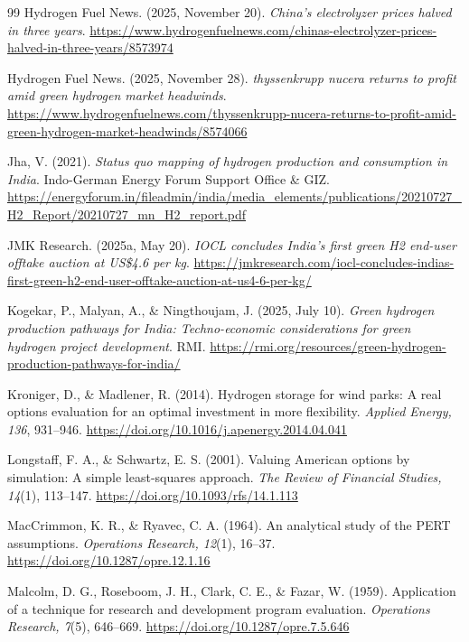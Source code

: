 {\begin{thebibliography}{99}
 Hydrogen Fuel News. (2025, November 20). \emph{China's electrolyzer prices halved in three years}. \url{https://www.hydrogenfuelnews.com/chinas-electrolyzer-prices-halved-in-three-years/8573974}

 Hydrogen Fuel News. (2025, November 28). \emph{thyssenkrupp nucera returns to profit amid green hydrogen market headwinds}. \url{https://www.hydrogenfuelnews.com/thyssenkrupp-nucera-returns-to-profit-amid-green-hydrogen-market-headwinds/8574066}

 Jha, V. (2021). \emph{Status quo mapping of hydrogen production and consumption in India}. Indo-German Energy Forum Support Office \& GIZ. \url{https://energyforum.in/fileadmin/india/media_elements/publications/20210727_H2_Report/20210727_mn_H2_report.pdf}

 JMK Research. (2025a, May 20). \emph{IOCL concludes India's first green H2 end-user offtake auction at US\$4.6 per kg}. \url{https://jmkresearch.com/iocl-concludes-indias-first-green-h2-end-user-offtake-auction-at-us4-6-per-kg/}

 Kogekar, P., Malyan, A., \& Ningthoujam, J. (2025, July 10). \emph{Green hydrogen production pathways for India: Techno-economic considerations for green hydrogen project development}. RMI. \url{https://rmi.org/resources/green-hydrogen-production-pathways-for-india/}

 Kroniger, D., \& Madlener, R. (2014). Hydrogen storage for wind parks: A real options evaluation for an optimal investment in more flexibility. \emph{Applied Energy, 136}, 931--946. \url{https://doi.org/10.1016/j.apenergy.2014.04.041}

 Longstaff, F. A., \& Schwartz, E. S. (2001). Valuing American options by simulation: A simple least-squares approach. \emph{The Review of Financial Studies, 14}(1), 113--147. \url{https://doi.org/10.1093/rfs/14.1.113}

 MacCrimmon, K. R., \& Ryavec, C. A. (1964). An analytical study of the PERT assumptions. \emph{Operations Research, 12}(1), 16--37. \url{https://doi.org/10.1287/opre.12.1.16}

 Malcolm, D. G., Roseboom, J. H., Clark, C. E., \& Fazar, W. (1959). Application of a technique for research and development program evaluation. \emph{Operations Research, 7}(5), 646--669. \url{https://doi.org/10.1287/opre.7.5.646}


\end{thebibliography}}

